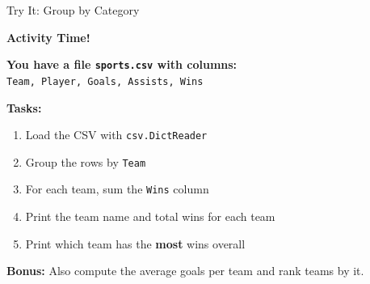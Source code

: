 \documentclass{csbeamer}
\begin{document}
\begin{frame}{Try It: Group by Category}
    \begin{center}
        \Large \textbf{Activity Time!}
    \end{center}

    \vspace{1em}

    \textbf{You have a file \texttt{sports.csv} with columns:}\\
    \texttt{Team, Player, Goals, Assists, Wins}

    \vspace{0.8em}

    \textbf{Tasks:}
    \begin{enumerate}
        \item Load the CSV with \texttt{csv.DictReader}
        \item Group the rows by \texttt{Team}
        \item For each team, sum the \texttt{Wins} column
        \item Print the team name and total wins for each team
        \item Print which team has the \textbf{most} wins overall
    \end{enumerate}

    \vspace{0.8em}

    \textbf{Bonus:} Also compute the average goals per team and rank teams by it.
\end{frame}
\end{document}
